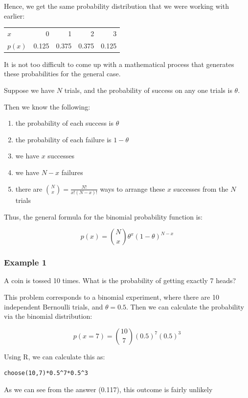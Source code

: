 \documentclass[11pt]{article}
\begin{document}
Hence, we get the same probability distribution that we were working with earlier:

\begin{center}
\begin{tabular}{lrrrr}
$x$ & 0 & 1 & 2 & 3\\
$p(x)$ & 0.125 & 0.375 & 0.375 & 0.125\\
\end{tabular}
\end{center}

It is not too difficult to come up with a mathematical process that generates these probabilities for the general case.

Suppose we have $N$ trials, and the probability of success on any one trials is $\theta$.  

Then we know the following:
\begin{enumerate}
\item the probability of each success is $\theta$
\item the probability of each failure is $1-\theta$
\item we have $x$ successes
\item we have $N-x$ failures
\item there are ${N\choose x}=\frac{N!}{x!(N-x)!}$ ways to arrange these $x$ successes from the $N$ trials
\end{enumerate}

Thus, the general formula for the binomial probability function is:

\[
p(x) = {N\choose x} \theta^x(1-\theta)^{N-x}
\]

\subsubsection*{Example 1}
\label{sec-2-1-1}
A coin is tossed 10 times.  What is the probability of getting exactly 7 heads?

This problem corresponds to a binomial experiment, where there are 10 independent Bernoulli trials, and $\theta=0.5$.  Then we can calculate the probability via the binomial distribution:

\[
p(x=7) = {10\choose 7} (0.5)^7(0.5)^3
\]

Using R, we can calculate this as:

\begin{verbatim}
choose(10,7)*0.5^7*0.5^3
\end{verbatim}

As we can see from the answer (0.117), this outcome is fairly unlikely
\end{document}
